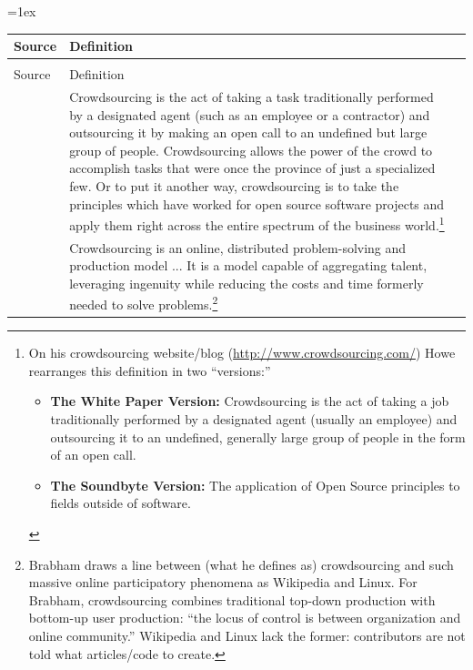 \documentclass[letterpaper,10pt,pagesize=pdftex,headings=normal]{scrreprt}
\begin{document}
\tabulinesep=1ex
\begin{longtabu} to

\toprule 
Source & Definition  \\ 
  \midrule \endfirsthead
  
 \\
\midrule 
Source & Definition \\ 
  \midrule \endhead 
  
\bottomrule \endlastfoot    
  
{} \endfoot  

\citet{howe2006,howe2008} & Crowdsourcing is the act of taking a task traditionally performed by a designated agent (such as an employee or a contractor) and outsourcing it by making an open call to an undefined but large group of people. Crowdsourcing allows the power of the crowd to accomplish tasks that were once the province of just a specialized few. Or to put it another way, crowdsourcing is to take the principles which have worked for open source software projects and apply them right across the entire spectrum of the business world.\footnote{On his crowdsourcing website/blog (\url{http://www.crowdsourcing.com/}) Howe rearranges this definition in two ``versions:''
\begin{itemize}
\item \textbf{The White Paper Version:} Crowdsourcing is the act of taking a job traditionally performed by a designated agent (usually an employee) and outsourcing it to an undefined, generally large group of people in the form of an open call. 
\item \textbf{The Soundbyte Version:} The application of Open Source principles to fields outside of software. 
\end{itemize}} \\

\midrule

\citet{brabham2013} & Crowdsourcing is an online, distributed problem-solving and production model ...  It is a model capable of
aggregating talent, leveraging ingenuity while reducing the costs and time formerly needed to solve problems.\footnote{Brabham draws a line between (what he defines as) crowdsourcing and such massive online participatory phenomena as Wikipedia and Linux. For Brabham, crowdsourcing combines traditional top-down production with bottom-up user production: ``the locus of control is between organization and online community.'' Wikipedia and Linux lack the former: contributors are not told what articles/code to create.} \\


\end{longtabu}
\end{document}
